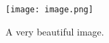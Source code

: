 
\usepackage{graphicx}

\graphicspath{{../Afbeeldingen}}



\begin{figure}[h]
	\begin{center}
		\texttt{[image: image.png]}
		\caption{A very beautiful image.}
		\label{fig:beautiful}
	\end{center}
\end{figure}
